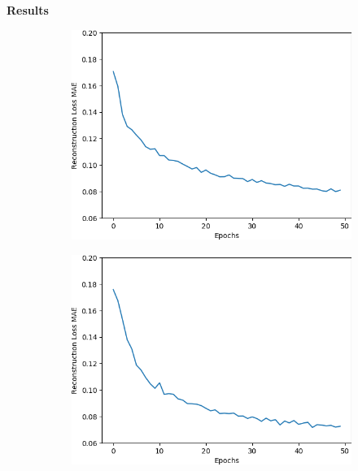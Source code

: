 \pagebreak
\textbf{Results}
\renewcommand{\thesubfigure}{\arabic{subfigure}}
\begin{figure}[H]
    \centering
    \begin{subfigure}{.25\textwidth}
        \centering
        \includegraphics[width=\textwidth]
        {images/figures/experiments_architecture/mae_graphKernel3adjusted2x2x256_dim1024.png}
        \caption{}
    \end{subfigure}%
    \begin{subfigure}{.25\textwidth}
        \centering
        \includegraphics[width=\textwidth]
        {images/figures/experiments_architecture/mae_graphKernel3adjusted4x4x128_dim1024.png}
        \caption{}
    \end{subfigure}%

\end{figure}
